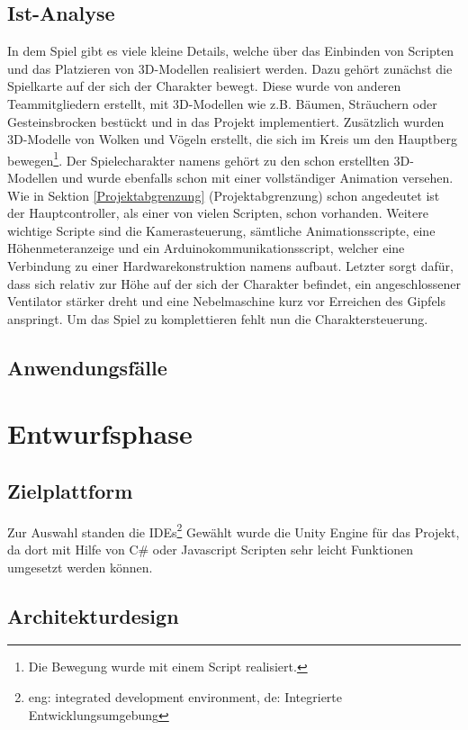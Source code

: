 \section{Ist-Analyse}
In dem Spiel gibt es viele kleine Details, welche über das Einbinden von Scripten und das Platzieren von 3D-Modellen realisiert werden. Dazu gehört zunächst die Spielkarte auf der sich der Charakter bewegt. Diese wurde von anderen Teammitgliedern erstellt, mit 3D-Modellen wie z.B. Bäumen, Sträuchern oder Gesteinsbrocken bestückt und in das Projekt implementiert. Zusätzlich wurden 3D-Modelle von Wolken und Vögeln erstellt, die sich im Kreis um den Hauptberg bewegen\footnote{Die Bewegung wurde mit einem Script realisiert.}.
Der Spielecharakter namens  gehört zu den schon erstellten 3D-Modellen und wurde ebenfalls schon mit einer vollständiger Animation versehen.
Wie in Sektion \ref{Projektabgrenzung} (Projektabgrenzung) schon angedeutet ist der Hauptcontroller, als einer von vielen Scripten, schon vorhanden. Weitere wichtige Scripte sind die Kamerasteuerung, sämtliche Animationsscripte, eine Höhenmeteranzeige und ein Arduinokommunikationsscript, welcher eine Verbindung zu einer Hardwarekonstruktion namens  aufbaut. Letzter sorgt dafür, dass sich relativ zur Höhe auf der sich der Charakter befindet, ein angeschlossener Ventilator stärker dreht und eine Nebelmaschine kurz vor Erreichen des Gipfels anspringt.
Um das Spiel zu komplettieren fehlt nun die Charaktersteuerung. 

\section{Anwendungsfälle}

\chapter{Entwurfsphase}
\section{Zielplattform}
Zur Auswahl standen die IDEs\footnote{eng: integrated development environment, de: Integrierte Entwicklungsumgebung} 
Gewählt wurde die Unity Engine für das Projekt, da dort mit Hilfe von C\# oder Javascript Scripten sehr leicht Funktionen umgesetzt werden können. 

\section{Architekturdesign}

